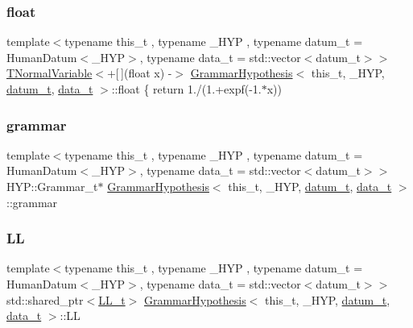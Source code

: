 \subsubsection{\texorpdfstring{float}{float}}
{\footnotesize\ttfamily template$<$typename this\+\_\+t , typename \+\_\+\+H\+YP , typename datum\+\_\+t  = Human\+Datum$<$\+\_\+\+H\+Y\+P$>$, typename data\+\_\+t  = std\+::vector$<$datum\+\_\+t$>$$>$ \\
\hyperlink{class_t_normal_variable}{T\+Normal\+Variable}$<$+\mbox{[}$\,$\mbox{]}(float x) -\/$>$ \hyperlink{class_grammar_hypothesis}{Grammar\+Hypothesis}$<$ this\+\_\+t, \+\_\+\+H\+YP, \hyperlink{class_bayesable_a9f1a6c0cd7855550fa10b1a8f13a5867}{datum\+\_\+t}, \hyperlink{class_bayesable_aa2788c4d7718c0a824e1d28c4c98f921}{data\+\_\+t} $>$\+::float \{ return 1./(1.+expf(-\/1.$\ast$x))}

\mbox{\label{class_grammar_hypothesis_afa17cc4569b9ac59eb3d232919a73917}} 
\subsubsection{\texorpdfstring{grammar}{grammar}}
{\footnotesize\ttfamily template$<$typename this\+\_\+t , typename \+\_\+\+H\+YP , typename datum\+\_\+t  = Human\+Datum$<$\+\_\+\+H\+Y\+P$>$, typename data\+\_\+t  = std\+::vector$<$datum\+\_\+t$>$$>$ \\
H\+Y\+P\+::\+Grammar\+\_\+t$\ast$ \hyperlink{class_grammar_hypothesis}{Grammar\+Hypothesis}$<$ this\+\_\+t, \+\_\+\+H\+YP, \hyperlink{class_bayesable_a9f1a6c0cd7855550fa10b1a8f13a5867}{datum\+\_\+t}, \hyperlink{class_bayesable_aa2788c4d7718c0a824e1d28c4c98f921}{data\+\_\+t} $>$\+::grammar}

\mbox{\label{class_grammar_hypothesis_a03f4757e1c6cbf99319dda821d061fe3}} 
\subsubsection{\texorpdfstring{LL}{LL}}
{\footnotesize\ttfamily template$<$typename this\+\_\+t , typename \+\_\+\+H\+YP , typename datum\+\_\+t  = Human\+Datum$<$\+\_\+\+H\+Y\+P$>$, typename data\+\_\+t  = std\+::vector$<$datum\+\_\+t$>$$>$ \\
std\+::shared\+\_\+ptr$<$\hyperlink{class_grammar_hypothesis_a7c6a6c59b0ba1ca6e225079d0cb7143b}{L\+L\+\_\+t}$>$ \hyperlink{class_grammar_hypothesis}{Grammar\+Hypothesis}$<$ this\+\_\+t, \+\_\+\+H\+YP, \hyperlink{class_bayesable_a9f1a6c0cd7855550fa10b1a8f13a5867}{datum\+\_\+t}, \hyperlink{class_bayesable_aa2788c4d7718c0a824e1d28c4c98f921}{data\+\_\+t} $>$\+::LL}


